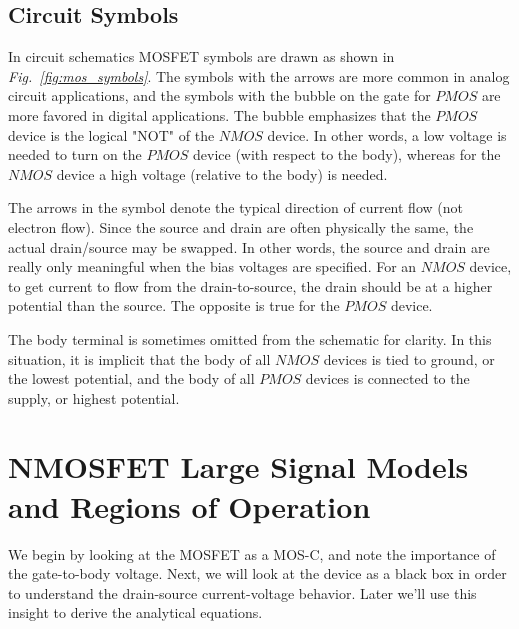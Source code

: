 \subsection{Circuit Symbols}
In circuit schematics MOSFET symbols are drawn as shown in \emph{Fig.~\ref{fig:mos_symbols}}.  The symbols with the arrows are more common in analog circuit applications, and the symbols with the bubble on the gate for $PMOS$ are more favored in digital applications.  The bubble emphasizes that the $PMOS$ device is the logical "NOT" of the $NMOS$ device. In other words, a low voltage is needed to turn on the $PMOS$ device (with respect to the body), whereas for the $NMOS$ device a high voltage (relative to the body) is needed.

The arrows in the symbol denote the typical direction of current flow (not electron flow).  Since the source and drain are often physically the same, the actual drain/source may be swapped.  In other words, the source and drain are really only meaningful when the bias voltages are specified. For an $NMOS$ device, to get current to flow from the drain-to-source, the drain should be at a higher potential than the source.  The opposite is true for the $PMOS$ device.

The body terminal is sometimes omitted from the schematic for clarity.  In this situation, it is implicit that the body of all $NMOS$ devices is tied to ground, or the lowest potential, and the body of all $PMOS$ devices is connected to the supply, or highest potential.
\section{NMOSFET Large Signal Models and Regions of Operation}
We begin by looking at the MOSFET as a MOS-C, and note the importance of the gate-to-body voltage.  Next, we will look at the device as a black box in order to understand the drain-source current-voltage behavior.  Later we'll use this insight to derive the analytical equations.
